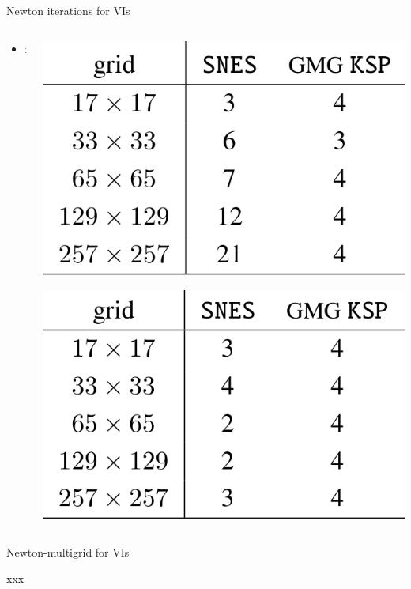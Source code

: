 \documentclass[svgnames,
               hyperref={colorlinks,citecolor=DeepPink4,linkcolor=FireBrick,urlcolor=Maroon},
               usepdftitle=false]  %
               {beamer}
\begin{document}
\begin{frame}{Newton iterations for VIs}

\begin{columns}
\begin{column}{0.6\textwidth}
\begin{itemize}
\item x
\end{itemize}
\end{column}
\begin{column}{0.4\textwidth}
\includegraphics[width=\textwidth]{images/vi-newton-gmg-bad.png}

\includegraphics[width=\textwidth]{images/vi-newton-gmg-good.png}
\end{column}
\end{columns}
\end{frame}


\begin{frame}{Newton-multigrid for VIs}

xxx
\end{frame}
\end{document}
